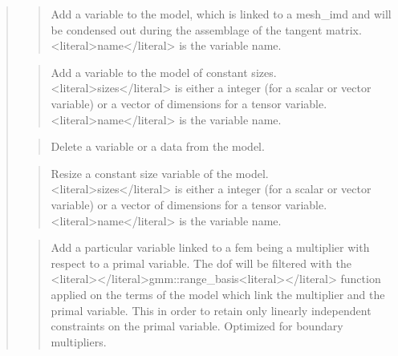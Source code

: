 \documentclass[a4paper,11pt,english]{sphinxmanual}
\begin{document}
\begin{quote}
\begin{quote}
\sphinxAtStartPar
Add a variable to the model, which is linked to a mesh\_imd and will be
condensed out during the assemblage of the tangent matrix. \textless{}literal\textgreater{}name\textless{}/literal\textgreater{} is
the variable name.
\end{quote}

\sphinxAtStartPar
{}
\begin{quote}

\sphinxAtStartPar
Add a variable to the model of constant sizes. \textless{}literal\textgreater{}sizes\textless{}/literal\textgreater{} is either a
integer (for a scalar or vector variable) or a vector of dimensions
for a tensor variable. \textless{}literal\textgreater{}name\textless{}/literal\textgreater{} is the variable name.
\end{quote}

\sphinxAtStartPar
{}
\begin{quote}

\sphinxAtStartPar
Delete a variable or a data from the model.
\end{quote}

\sphinxAtStartPar
{}
\begin{quote}

\sphinxAtStartPar
Resize a  constant size variable of the model.  \textless{}literal\textgreater{}sizes\textless{}/literal\textgreater{} is either a
integer (for a scalar or vector variable) or a vector of dimensions
for a tensor variable. \textless{}literal\textgreater{}name\textless{}/literal\textgreater{} is the variable name.
\end{quote}

\sphinxAtStartPar
{}
\begin{quote}

\sphinxAtStartPar
Add a particular variable linked to a fem being a multiplier with
respect to a primal variable. The dof will be filtered with the
\textless{}literal\textgreater{}\textless{}/literal\textgreater{}gmm::range\_basis\textless{}literal\textgreater{}\textless{}/literal\textgreater{} function applied on the terms of the model
which link the multiplier and the primal variable. This in order to
retain only linearly independent constraints on the primal variable.
Optimized for boundary multipliers.
\end{quote}


\end{quote}
\end{document}
